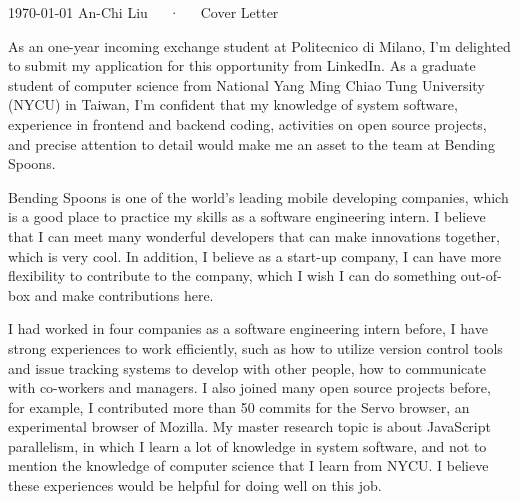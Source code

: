 \documentclass[11pt, a4paper]{awesome-cv}
\begin{document}
\makecvheader[R]

\makecvfooter
  {\today}
  {An-Chi Liu~~~·~~~Cover Letter}
  {}

\makelettertitle

\begin{cvletter}

As an one-year incoming exchange student at Politecnico di Milano, I’m delighted to submit my
application for this opportunity from LinkedIn. As a graduate student of computer science from
National Yang Ming Chiao Tung University (NYCU) in Taiwan, I’m confident that my knowledge of
system software, experience in frontend and backend coding, activities on open source projects,
and precise attention to detail would make me an asset to the team at Bending Spoons.


Bending Spoons is one of the world's leading mobile developing companies, which is a good place to
practice my skills as a software engineering intern. I believe that I can meet many wonderful
developers that can make innovations together, which is very cool. In addition, I believe as a 
start-up company, I can have more flexibility to contribute to the company, which I wish I can
do something out-of-box and make contributions here.

I had worked in four companies as a software engineering intern before, I have strong experiences
to work efficiently, such as how to utilize version control tools and issue tracking systems to
develop with other people, how to communicate with co-workers and managers. I also joined many
open source projects before, for example, I contributed more than 50 commits for the Servo browser,
an experimental browser of Mozilla. My master research topic is about JavaScript parallelism,
in which I learn a lot of knowledge in system software, and not to mention the knowledge of
computer science that I learn from NYCU. I believe these experiences would be helpful for doing
well on this job.
  
\end{cvletter}


\makeletterclosing
\end{document}
